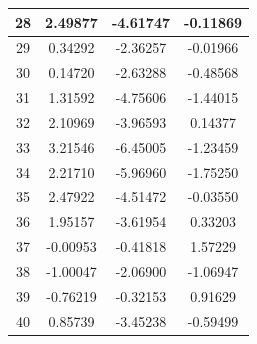 \documentclass[14pt,a4paper]{scrartcl}
\begin{document}
\begin{table}[ht]
\begin{tabular}{|c||c||c||c|}
		\hline
		28 & 2.49877 & -4.61747 & -0.11869 \\ 
		\hline
		29 & 0.34292 & -2.36257 & -0.01966 \\ 
		\hline
		30 & 0.14720 & -2.63288 & -0.48568 \\ 
		\hline
		31 & 1.31592 & -4.75606 & -1.44015 \\ 
		\hline
		32 & 2.10969 & -3.96593 & 0.14377 \\ 
		\hline
		33 & 3.21546 & -6.45005 & -1.23459 \\ 
		\hline
		34 & 2.21710 & -5.96960 & -1.75250 \\ 
		\hline
		35 & 2.47922 & -4.51472 & -0.03550 \\ 
		\hline
		36 & 1.95157 & -3.61954 & 0.33203 \\ 
		\hline
		37 & -0.00953 & -0.41818 & 1.57229 \\ 
		\hline
		38 & -1.00047 & -2.06900 & -1.06947 \\ 
		\hline
		39 & -0.76219 & -0.32153 & 0.91629 \\ 
		\hline
		40 & 0.85739 & -3.45238 & -0.59499 \\ 	
	\end{tabular}
\end{table}
\end{document}
